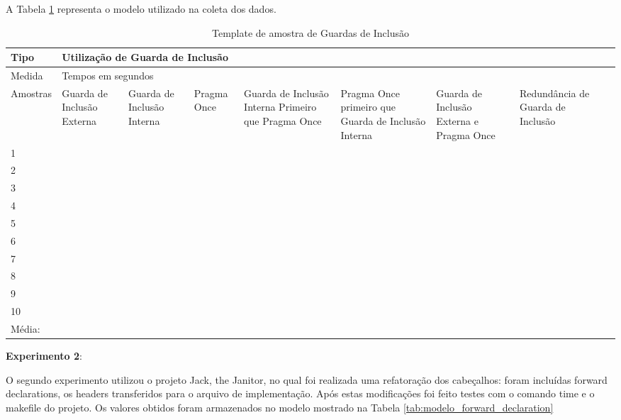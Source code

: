 A Tabela \ref{tab:modelo_guards} representa o modelo utilizado na coleta dos
 dados.


\begin{table}[h]
\centering
\begin{tabular}{|l|p{1.5cm}|p{1.5cm}|p{1.5cm}|p{1.5cm}|p{2cm}|p{2cm}|p{2cm}|p{2cm}|}
\hline
Tipo & \multicolumn{7}{l|}{Utilização de Guarda de Inclusão} \\ \hline
Medida & \multicolumn{7}{l|}{Tempos em segundos } \\ \hline
Amostras & Guarda de Inclusão Externa & Guarda de Inclusão Interna & Pragma Once & Guarda de Inclusão Interna Primeiro que Pragma Once & Pragma Once primeiro que Guarda de Inclusão Interna & Guarda de Inclusão Externa e Pragma Once & Redundância de Guarda de Inclusão \\ \hline
 1  &  &  &   &   &   &  & \\ \hline
 2  &  &  &   &   &   &  & \\ \hline
 3  &  &  &   &   &   &  & \\ \hline
 4  &  &  &   &   &   &  & \\ \hline
 5  &  &  &   &   &   &  & \\ \hline
 6  &  &  &   &   &   &  & \\ \hline
 7  &  &  &   &   &   &  & \\ \hline 
 8  &  &  &   &   &   &  & \\ \hline
 9  &  &  &   &   &   &  & \\ \hline
 10 &  &  &   &   &   &  & \\ \hline
 Média: &  &  & & &   &  & \\ \hline
\end{tabular}
\caption{Template de amostra de Guardas de Inclusão}
\label{tab:modelo_guards}
\end{table}


\textbf{Experimento 2}:

O segundo experimento utilizou o projeto Jack, the Janitor, no qual foi
 realizada uma refatoração dos cabeçalhos: foram incluídas forward
 declarations, os headers transferidos para o arquivo de
 implementação. Após estas modificações foi feito testes com o comando
 time e o makefile do projeto. Os valores obtidos foram armazenados no
 modelo mostrado na Tabela \ref{tab:modelo_forward_declaration}

